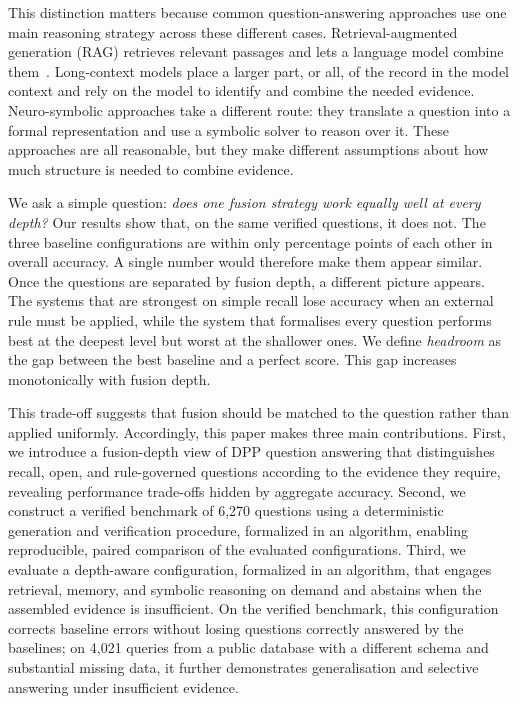 \documentclass[conference]{IEEEtran}
\begin{document}
This distinction matters because common question-answering approaches use one
main reasoning strategy across these different cases. Retrieval-augmented
generation (RAG) retrieves relevant passages and lets a language model combine
them~\cite{lewis2020rag,izacard2021passage}. Long-context models place a larger
part, or all, of the record in the model context and rely on the model to
identify and combine the needed evidence. Neuro-symbolic approaches take a
different route: they translate a question into a formal representation and use
a symbolic solver to reason over it. These approaches are all reasonable, but
they make different assumptions about how much structure is needed to combine
evidence.

We ask a simple question: \emph{does one fusion strategy work equally well at
every depth?} Our results show that, on the same verified questions, it does
not. The three baseline configurations are within only \SpreadOverall{}
percentage points of each other in overall accuracy. A single number would
therefore make them appear similar. Once the questions are separated by fusion
depth, a different picture appears. The systems that are strongest on simple
recall lose accuracy when an external rule must be applied, while the system
that formalises every question performs best at the deepest level but worst at
the shallower ones. We define \emph{headroom} as the gap between the best baseline and a perfect score. This gap increases monotonically with
fusion depth.


This trade-off suggests that fusion should be matched to the question rather than applied uniformly. Accordingly, this paper makes three main contributions. First, we introduce a fusion-depth view of DPP question answering that distinguishes recall, open, and rule-governed questions according to the evidence they require, revealing performance trade-offs hidden by aggregate accuracy. Second, we construct a verified benchmark of 6,270 questions using a deterministic generation and verification procedure, formalized in an algorithm, enabling reproducible, paired comparison of the evaluated configurations. Third, we evaluate a depth-aware configuration, formalized in an algorithm, that engages retrieval, memory, and symbolic reasoning on demand and abstains when the assembled evidence is insufficient. On the verified benchmark, this configuration corrects baseline errors without losing questions correctly answered by the baselines; on 4,021 queries from a public database with a different schema and substantial missing data, it further demonstrates generalisation and selective answering under insufficient evidence.
\end{document}
